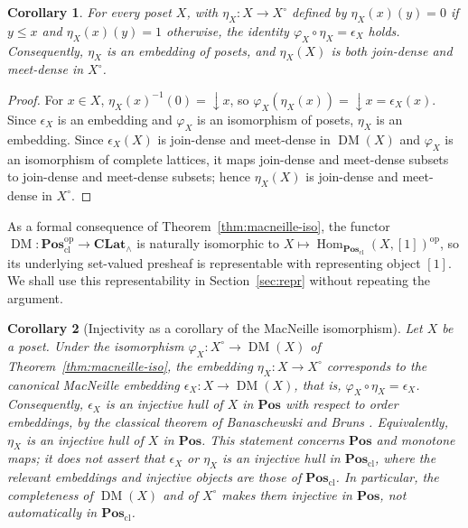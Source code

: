 \documentclass{amsart}
\theoremstyle{plain}
\newtheorem{corollary}{Corollary}[section]
\theoremstyle{definition}
\theoremstyle{remark}
\DeclareMathOperator{\DM}{DM}
\DeclareMathOperator{\Hom}{Hom}
\begin{document}
\begin{corollary}\label{cor:varphi-eta-epsilon}
For every poset $X$, with $\eta_X\colon X\to X^\circ$ defined by $\eta_X(x)(y)=0$ if $y\leq x$ and $\eta_X(x)(y)=1$ otherwise, the identity $\varphi_X\circ\eta_X=\epsilon_X$ holds. Consequently, $\eta_X$ is an embedding of posets, and $\eta_X(X)$ is both join-dense and meet-dense in $X^\circ$.
\end{corollary}

\begin{proof}
For $x\in X$, $\eta_X(x)^{-1}(0)=\downarrow x$, so $\varphi_X(\eta_X(x))=\downarrow x=\epsilon_X(x)$. Since $\epsilon_X$ is an embedding and $\varphi_X$ is an isomorphism of posets, $\eta_X$ is an embedding. Since $\epsilon_X(X)$ is join-dense and meet-dense in $\DM(X)$ and $\varphi_X$ is an isomorphism of complete lattices, it maps join-dense and meet-dense subsets to join-dense and meet-dense subsets; hence $\eta_X(X)$ is join-dense and meet-dense in $X^\circ$.
\end{proof}

As a formal consequence of Theorem~\ref{thm:macneille-iso}, the functor $\DM\colon\mathbf{Pos}_{\mathrm{cl}}^{\mathrm{op}}\to\mathbf{CLat}_\wedge$ is naturally isomorphic to $X\mapsto\Hom_{\mathbf{Pos}_{\mathrm{cl}}}(X,[1])^{\mathrm{op}}$, so its underlying set-valued presheaf is representable with representing object $[1]$. We shall use this representability in Section~\ref{sec:repr} without repeating the argument.

\begin{corollary}[Injectivity as a corollary of the MacNeille isomorphism]\label{cor:eta-injective-hull}
Let $X$ be a poset. Under the isomorphism $\varphi_X\colon X^\circ\to\DM(X)$ of Theorem~\ref{thm:macneille-iso}, the embedding $\eta_X\colon X\to X^\circ$ corresponds to the canonical MacNeille embedding $\epsilon_X\colon X\to\DM(X)$, that is, $\varphi_X\circ\eta_X=\epsilon_X$. Consequently, $\epsilon_X$ is an injective hull of $X$ in $\mathbf{Pos}$ with respect to order embeddings, by the classical theorem of Banaschewski and Bruns \cite{banaschewski1967categorical,adamek2004abstract}. Equivalently, $\eta_X$ is an injective hull of $X$ in $\mathbf{Pos}$. This statement concerns $\mathbf{Pos}$ and monotone maps; it does not assert that $\epsilon_X$ or $\eta_X$ is an injective hull in $\mathbf{Pos}_{\mathrm{cl}}$, where the relevant embeddings and injective objects are those of $\mathbf{Pos}_{\mathrm{cl}}$. In particular, the completeness of $\DM(X)$ and of $X^\circ$ makes them injective in $\mathbf{Pos}$, not automatically in $\mathbf{Pos}_{\mathrm{cl}}$.
\end{corollary}
\end{document}
